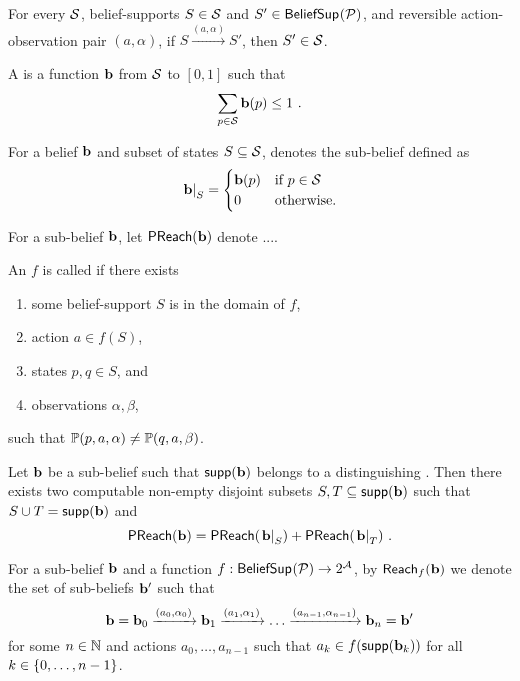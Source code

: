 %
\begin{lemma}
For every \aodscc{} $\mathcal{S}$, belief-supports $S\in \mathcal{S}$ and $S'\in \mathsf{BeliefSup}_{}(\mathcal{P})$, and reversible action-observation pair $(a,\alpha)$,
if $S \xrightarrow{(a,\alpha)} S'$,
then $S' \in\mathcal{S}$.
\end{lemma}
%
\begin{definition}
A  is a function $\mathbf{b}$ from $\mathcal{S}$ to $[0,1]$ such that
\[
\sum_{p\in\mathcal{S}} \mathbf{b}(p) \leq 1 \ .
\]
\end{definition}
%
\begin{notation}
For a belief $\mathbf{b}$ and subset of states $S\subseteq \mathcal{S}$,
 denotes the sub-belief defined as
\[
\left.\mathbf{b}\right|_{S} =
\begin{cases}
\mathbf{b}(p) & \text{if $p\in\mathcal{S}$} \\
0 & \text{otherwise.}
\end{cases}
\]
\end{notation}
%
\begin{definition}
For a sub-belief $\mathbf{b}$,
let $\mathsf{PReach}(\mathbf{b})$ denote ....
\end{definition}
%
\begin{definition}
 An \adscc{} $f$ is called  if there exists
\begin{enumerate}
\item some belief-support $S$ is in the domain of $f$,
\item action $a \in f(S)$,
\item states $p,q\in S$, and
\item observations $\alpha,\beta$,
\end{enumerate}
such that $\mathbb{P}(p,a,\alpha) \neq \mathbb{P}(q,a,\beta)$. 
\end{definition}
%
\begin{lemma}
Let $\mathbf{b}$ be a sub-belief such that $\mathsf{supp}(\mathbf{b})$ belongs to a distinguishing \adscc{}.
Then there exists two computable non-empty disjoint subsets $S,T\subseteq \mathsf{supp}(\mathbf{b})$ such that $S\cup T = \mathsf{supp}(\mathbf{b})$ and
\[
\mathsf{PReach}(\mathbf{b}) =
\mathsf{PReach}(\left.\mathbf{b}\right|_{S}) +
\mathsf{PReach}(\left.\mathbf{b}\right|_{T}) \ .
\]
\end{lemma}
%
\begin{notation}
For a sub-belief $\mathbf{b}$ and a function $f : \mathsf{BeliefSup}_{}(\mathcal{P}) \to 2^{\mathcal{A}}$,
by $\mathsf{Reach}_{f}(\mathbf{b})$ we denote the set of sub-beliefs $\mathbf{b}'$ such that
\[
\mathbf{b} =
\mathbf{b}_0 \xrightarrow{(a_0,\alpha_0)}
\mathbf{b}_1 \xrightarrow{(a_1,\alpha_1)}
\dots
\xrightarrow{(a_{n-1},\alpha_{n-1})}
\mathbf{b}_n = \mathbf{b}'
\]
for some $n\in\mathbb{N}$ and actions $a_0,\dots,a_{n-1}$ such that $a_k\in f(\mathsf{supp}(\mathbf{b}_k))$ for all $k\in\left\lbrace 0,\dots,n-1\right\rbrace$.
\end{notation}
